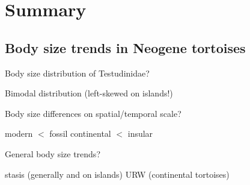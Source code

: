 \section{Summary}

\subsection{Body size trends in Neogene tortoises}

\begin{frame}
\begin{enumerate}[<+->]
\p Body size distribution of Testudinidae?
\begin{itemize}
	\p[\pf] Bimodal distribution (left-skewed on islands!)
\end{itemize}
\p Body size differences on spatial/temporal scale?
\begin{itemize}
	\p[\pf] modern $<$ fossil
	\p[\pf] continental $<$ insular
\end{itemize}
\p General body size trends?
\begin{itemize}
	\p[\pf] stasis (generally and on islands)
	\p[\pf] URW (continental tortoises)
\end{itemize}


\end{enumerate}
\end{frame}